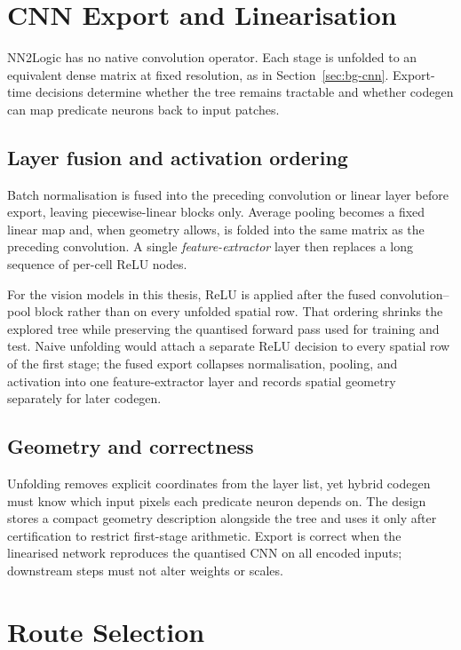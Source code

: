 \section{CNN Export and Linearisation}
\label{sec:design-encoding}

NN2Logic has no native convolution operator.
Each stage is unfolded to an equivalent dense matrix at fixed resolution, as in Section~\ref{sec:bg-cnn}.
Export-time decisions determine whether the tree remains tractable and whether codegen can map predicate neurons back to input patches.

\subsection{Layer fusion and activation ordering}

Batch normalisation is fused into the preceding convolution or linear layer before export, leaving piecewise-linear blocks only.
Average pooling becomes a fixed linear map and, when geometry allows, is folded into the same matrix as the preceding convolution.
A single \emph{feature-extractor} layer then replaces a long sequence of per-cell ReLU nodes.

For the vision models in this thesis, ReLU is applied after the fused convolution--pool block rather than on every unfolded spatial row.
That ordering shrinks the explored tree while preserving the quantised forward pass used for training and test.
Naive unfolding would attach a separate ReLU decision to every spatial row of the first stage; the fused export collapses normalisation, pooling, and activation into one feature-extractor layer and records spatial geometry separately for later codegen.

\subsection{Geometry and correctness}

Unfolding removes explicit coordinates from the layer list, yet hybrid codegen must know which input pixels each predicate neuron depends on.
The design stores a compact geometry description alongside the tree and uses it only after certification to restrict first-stage arithmetic.
Export is correct when the linearised network reproduces the quantised \ac{CNN} on all encoded inputs; downstream steps must not alter weights or scales.


\section{Route Selection}
\label{sec:design-routes}

